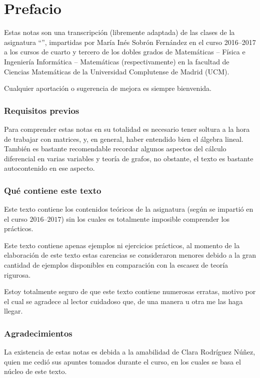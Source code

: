 \chapter*{Prefacio}
Estas notas son una transcripción (libremente adaptada) de las clases de la asignatura ``'', impartidas por María Inés Sobrón Fernández en el curso 2016--2017 a los cursos de cuarto y tercero de los dobles grados de  Matemáticas -- Física e Ingeniería Informática -- Matemáticas (respectivamente) en la facultad de Ciencias Matemáticas de la Universidad Complutense de Madrid (UCM).

Cualquier aportación o sugerencia de mejora es siempre bienvenida.
\subsection*{Requisitos previos}
Para comprender estas notas en su totalidad es necesario tener soltura a la hora de trabajar con matrices, y, en general, haber entendido bien el álgebra lineal. También es bastante recomendable recordar algunos aspectos del cálculo diferencial en varias variables y teoría de grafos, no obstante, el texto es bastante autocontenido en ese aspecto.
\subsection*{Qué contiene este texto}
Este texto contiene  los contenidos teóricos de la asignatura (según se impartió en el curso $2016$--$2017$) sin los cuales es totalmente imposible comprender los prácticos. 

Este texto  contiene apenas ejemplos ni ejercicios prácticos, al momento de la elaboración de este texto estas carencias se consideraron menores debido a la gran cantidad de ejemplos disponibles en comparación con la escasez de teoría rigurosa.

Estoy totalmente seguro de que este texto contiene numerosas erratas, motivo por el cual se agradece al lector cuidadoso que, de una manera u otra me las haga llegar.
\subsection*{Agradecimientos}
La existencia de estas notas es debida a la amabilidad de Clara Rodríguez Núñez, quien me cedió sus apuntes tomados durante el curso, en los cuales se basa el núcleo de este texto.
